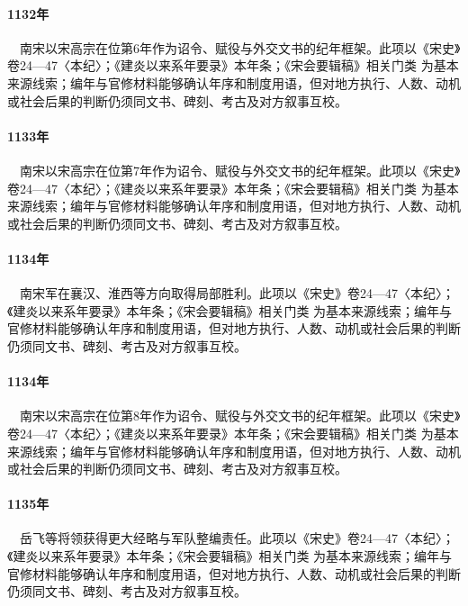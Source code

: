 \paragraph{1132年}　南宋以宋高宗在位第6年作为诏令、赋役与外交文书的纪年框架。此项以《宋史》卷24—47〈本纪〉；《建炎以来系年要录》本年条；《宋会要辑稿》相关门类 为基本来源线索；编年与官修材料能够确认年序和制度用语，但对地方执行、人数、动机或社会后果的判断仍须同文书、碑刻、考古及对方叙事互校。

\paragraph{1133年}　南宋以宋高宗在位第7年作为诏令、赋役与外交文书的纪年框架。此项以《宋史》卷24—47〈本纪〉；《建炎以来系年要录》本年条；《宋会要辑稿》相关门类 为基本来源线索；编年与官修材料能够确认年序和制度用语，但对地方执行、人数、动机或社会后果的判断仍须同文书、碑刻、考古及对方叙事互校。

\paragraph{1134年}　南宋军在襄汉、淮西等方向取得局部胜利。此项以《宋史》卷24—47〈本纪〉；《建炎以来系年要录》本年条；《宋会要辑稿》相关门类 为基本来源线索；编年与官修材料能够确认年序和制度用语，但对地方执行、人数、动机或社会后果的判断仍须同文书、碑刻、考古及对方叙事互校。

\paragraph{1134年}　南宋以宋高宗在位第8年作为诏令、赋役与外交文书的纪年框架。此项以《宋史》卷24—47〈本纪〉；《建炎以来系年要录》本年条；《宋会要辑稿》相关门类 为基本来源线索；编年与官修材料能够确认年序和制度用语，但对地方执行、人数、动机或社会后果的判断仍须同文书、碑刻、考古及对方叙事互校。

\paragraph{1135年}　岳飞等将领获得更大经略与军队整编责任。此项以《宋史》卷24—47〈本纪〉；《建炎以来系年要录》本年条；《宋会要辑稿》相关门类 为基本来源线索；编年与官修材料能够确认年序和制度用语，但对地方执行、人数、动机或社会后果的判断仍须同文书、碑刻、考古及对方叙事互校。

